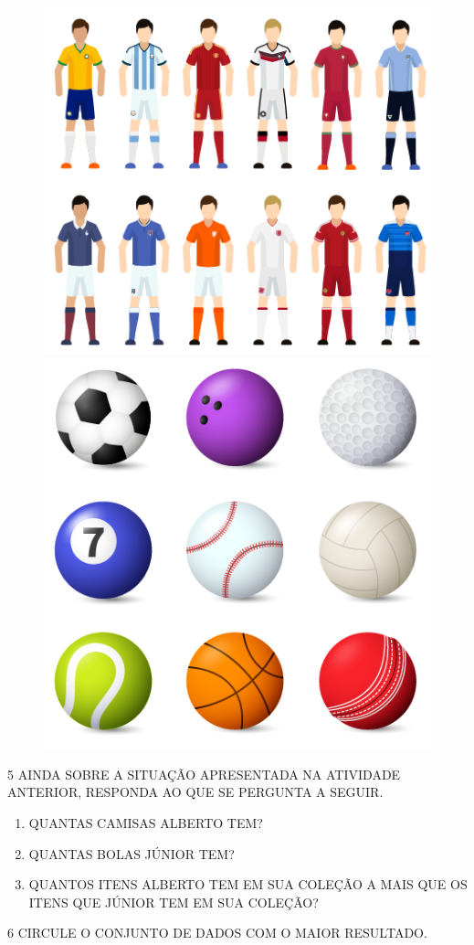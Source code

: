 \begin{figure}[htpb!]
\includegraphics[width=.5\textwidth]{../ilustracoes/MAT1/SAEB_1ANO_MAT_FIGURA5.png}
\includegraphics[width=.45\textwidth]{../ilustracoes/MAT1/SAEB_1ANO_MAT_FIGURA5a.png}
\end{figure}


\num{5} AINDA SOBRE A SITUAÇÃO APRESENTADA NA ATIVIDADE ANTERIOR, RESPONDA AO QUE SE PERGUNTA A SEGUIR.

\begin{enumerate}
\item
  QUANTAS CAMISAS ALBERTO TEM? 

\item
  QUANTAS BOLAS JÚNIOR TEM? 

\item
  QUANTOS ITENS ALBERTO TEM EM SUA COLEÇÃO A MAIS QUE OS ITENS QUE JÚNIOR TEM EM SUA COLEÇÃO?

\end{enumerate}

\pagebreak
\num{6} CIRCULE O CONJUNTO DE DADOS COM O MAIOR RESULTADO.

